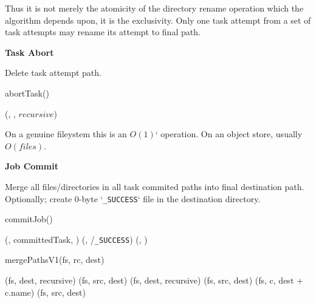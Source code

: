 \documentclass[conference]{IEEEtran}
\newcommand{\SUCCESS}{\texttt{\_SUCCESS}}
\begin{document}
Thus it is not merely the atomicity of the directory rename operation
which the algorithm depends upon, it is the exclusivity.
Only one task attempt from a set of task attempts may rename its attempt to
final path.

\textbf{Task Abort}

Delete task attempt path.

\begin{procedure}
\caption{abortTask()}

  \delete(\fs, \taskAttemptPath, $recursive$)\;
\end{procedure}


On a genuine fileystem this is an $O(1)$` operation.
On an object store, usually $O(files)$.


\textbf{Job Commit}

Merge all files/directories in all task commited paths into final destination path.
Optionally;
create 0-byte `\SUCCESS` file in the destination directory.

\begin{procedure*}
  \caption{commitJob()}

   {
    \mergePaths(\fs, committedTask, \dest)\;
  }
  \touch(\fs, \dest/\SUCCESS)\;
  \delete(\fs, \temp)\;
\end{procedure*}

\begin{procedure*}
\label{alg:mergePathsV1}
\caption{mergePathsV1(fs, rc, dest)}


 {
   {
    \delete(fs, dest, recursive)\;
  }
  \rename(fs, src, dest)\;
} {
   {
     {
      \delete(fs, dest, recursive)\;
      \rename(fs, src, dest)\;
    } {
       {
       \mergePaths(fs, c, dest + c.name)\;
      }
    }
  }{
   \rename(fs, src, dest)\;
  }
}

\end{procedure*}
\end{document}
